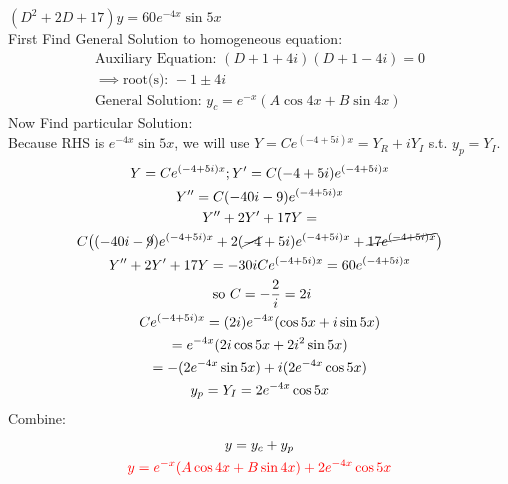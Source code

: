 \item [18.] $(D^2+2D+17)y=60e^{-4x}\sin{5x}$\\[2mm]
First Find General Solution to homogeneous equation:
\begin{gather*}
    \text{Auxiliary Equation: } (D+1+4i)(D+1-4i)=0\\
    \implies \text{root(s): } -1\pm 4i\\
    \text{General Solution: } y_c=e^{-x}(A\cos{4x}+B\sin{4x})
\end{gather*}
Now Find particular Solution:\\
Because RHS is $e^{-4x}\sin{5x}$, we will use $Y=Ce^{(-4+5i)x}=Y_R+iY_I$ s.t. $y_p=Y_I$.
\begin{gather*}
    Y=Ce^{(-4+5i)x}; Y'=C(-4+5i)e^{(-4+5i)x}\\
    Y''=C(-40i-9)e^{(-4+5i)x}\\
    Y''+2Y'+17Y =\\ C
    \big(
    (-40i-\cancel{9})e^{(-4+5i)x}
    +2(\cancel{-4}+5i)e^{(-4+5i)x}
    +\cancel{17e^{(-4+5i)x}}
    \big)\\
    Y''+2Y'+17Y=-30iCe^{(-4+5i)x}=60e^{(-4+5i)x}\\
    \text{ so } C=-\frac{2}{i}=2i\\
    Ce^{(-4+5i)x}=(2i)e^{-4x}(\cos{5x}+i\sin{5x})\\
    =e^{-4x}(2i\cos{5x}+2i^2\sin{5x})\\
    =-(2e^{-4x}\sin{5x})+i(2e^{-4x}\cos{5x})\\
    y_p = Y_I = 2e^{-4x}\cos{5x}
\end{gather*}
Combine:
\begin{gather*}
    y=y_c+y_p\\
    \textcolor{red}{y = e^{-x}(A\cos{4x}+B\sin{4x})+2e^{-4x}\cos{5x}}
\end{gather*}